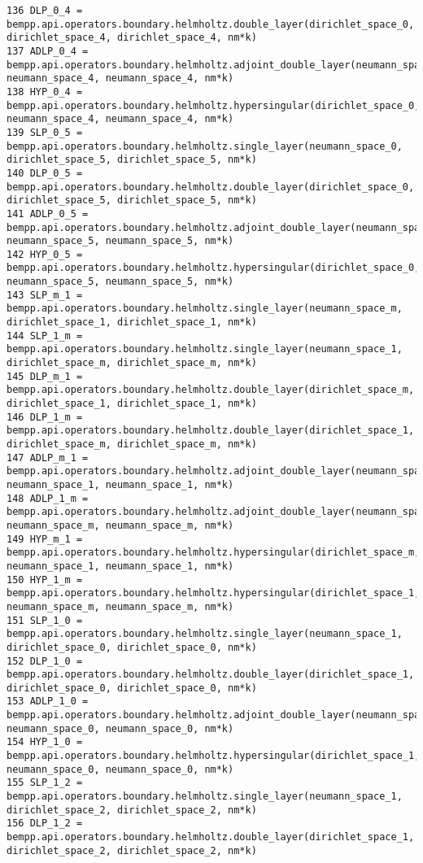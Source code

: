 \documentclass[12pt,letterpaper]{report}
\numberwithin{equation}{section}
\begin{document}
\begin{lstlisting}
136 DLP_0_4 = bempp.api.operators.boundary.helmholtz.double_layer(dirichlet_space_0, dirichlet_space_4, dirichlet_space_4, nm*k)
137 ADLP_0_4 = bempp.api.operators.boundary.helmholtz.adjoint_double_layer(neumann_space_0, neumann_space_4, neumann_space_4, nm*k)
138 HYP_0_4 = bempp.api.operators.boundary.helmholtz.hypersingular(dirichlet_space_0, neumann_space_4, neumann_space_4, nm*k)
139 SLP_0_5 = bempp.api.operators.boundary.helmholtz.single_layer(neumann_space_0, dirichlet_space_5, dirichlet_space_5, nm*k)
140 DLP_0_5 = bempp.api.operators.boundary.helmholtz.double_layer(dirichlet_space_0, dirichlet_space_5, dirichlet_space_5, nm*k)
141 ADLP_0_5 = bempp.api.operators.boundary.helmholtz.adjoint_double_layer(neumann_space_0, neumann_space_5, neumann_space_5, nm*k)
142 HYP_0_5 = bempp.api.operators.boundary.helmholtz.hypersingular(dirichlet_space_0, neumann_space_5, neumann_space_5, nm*k)
143 SLP_m_1 = bempp.api.operators.boundary.helmholtz.single_layer(neumann_space_m, dirichlet_space_1, dirichlet_space_1, nm*k)
144 SLP_1_m = bempp.api.operators.boundary.helmholtz.single_layer(neumann_space_1, dirichlet_space_m, dirichlet_space_m, nm*k)
145 DLP_m_1 = bempp.api.operators.boundary.helmholtz.double_layer(dirichlet_space_m, dirichlet_space_1, dirichlet_space_1, nm*k)
146 DLP_1_m = bempp.api.operators.boundary.helmholtz.double_layer(dirichlet_space_1, dirichlet_space_m, dirichlet_space_m, nm*k)
147 ADLP_m_1 = bempp.api.operators.boundary.helmholtz.adjoint_double_layer(neumann_space_m, neumann_space_1, neumann_space_1, nm*k)
148 ADLP_1_m = bempp.api.operators.boundary.helmholtz.adjoint_double_layer(neumann_space_1, neumann_space_m, neumann_space_m, nm*k)
149 HYP_m_1 = bempp.api.operators.boundary.helmholtz.hypersingular(dirichlet_space_m, neumann_space_1, neumann_space_1, nm*k)
150 HYP_1_m = bempp.api.operators.boundary.helmholtz.hypersingular(dirichlet_space_1, neumann_space_m, neumann_space_m, nm*k)
151 SLP_1_0 = bempp.api.operators.boundary.helmholtz.single_layer(neumann_space_1, dirichlet_space_0, dirichlet_space_0, nm*k)
152 DLP_1_0 = bempp.api.operators.boundary.helmholtz.double_layer(dirichlet_space_1, dirichlet_space_0, dirichlet_space_0, nm*k)
153 ADLP_1_0 = bempp.api.operators.boundary.helmholtz.adjoint_double_layer(neumann_space_1, neumann_space_0, neumann_space_0, nm*k)
154 HYP_1_0 = bempp.api.operators.boundary.helmholtz.hypersingular(dirichlet_space_1, neumann_space_0, neumann_space_0, nm*k)
155 SLP_1_2 = bempp.api.operators.boundary.helmholtz.single_layer(neumann_space_1, dirichlet_space_2, dirichlet_space_2, nm*k)
156 DLP_1_2 = bempp.api.operators.boundary.helmholtz.double_layer(dirichlet_space_1, dirichlet_space_2, dirichlet_space_2, nm*k)

\end{lstlisting}
\end{document}
